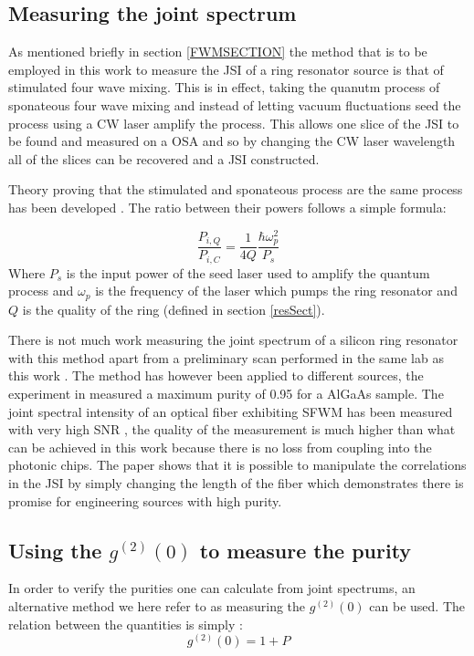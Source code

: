 \subsection{Measuring the joint spectrum} \label{marcoStuff}
As mentioned briefly in section \ref{FWMSECTION} the method that is to be employed in this work to measure the JSI of a ring resonator source is that of stimulated four wave mixing. This is in effect, taking the quanutm process of sponateous four wave mixing and instead of letting vacuum fluctuations seed the process using a CW laser amplify the process. This allows one slice of the JSI to be found and measured on a OSA and so by changing the CW laser wavelength all of the slices can be recovered and a JSI constructed.


Theory proving that the stimulated and sponateous process are the same process has been developed \cite{azzini_classical_2012}. The ratio between their powers follows a simple formula:

\begin{equation}
\frac{P_{i,Q}} {P_{i,C}}=\frac{1}{4Q}\frac{\hbar\omega_p^2}{P_s}
\end{equation}
Where $P_s$ is the input power of the seed laser used to amplify the quantum process and $\omega_p$ is the frequency of the laser which pumps the ring resonator and $Q$ is the quality of the ring (defined in section \ref{resSect}).

There is not much work measuring the joint spectrum of a silicon ring resonator with this method apart from a preliminary scan performed in the same lab as this work \cite{silverstone_-chip_2014}. The method has however been applied to different sources, the experiment in \cite{eckstein_direct_2014} measured a maximum purity of 0.95 for a AlGaAs sample. The joint spectral intensity of an optical fiber exhibiting SFWM has been measured with very high SNR \cite{fang_fast_2014}, the quality of the measurement is much higher than what can be achieved in this work because there is no loss from coupling into the photonic chips. The paper shows that it is possible to manipulate the correlations in the JSI by simply changing the length of the fiber which demonstrates there is promise for engineering sources with high purity.

\subsection{Using the $g^{(2)}(0)$ to measure the purity}
In order to verify the purities one can calculate from joint spectrums, an alternative method we here refer to as measuring the $g^{(2)}(0)$ can be used. The relation between the quantities is simply \cite{christ_probing_2011}: 
\begin{equation} \label{g2Equation}
	g^{(2)}(0) = 1 + P
\end{equation}

